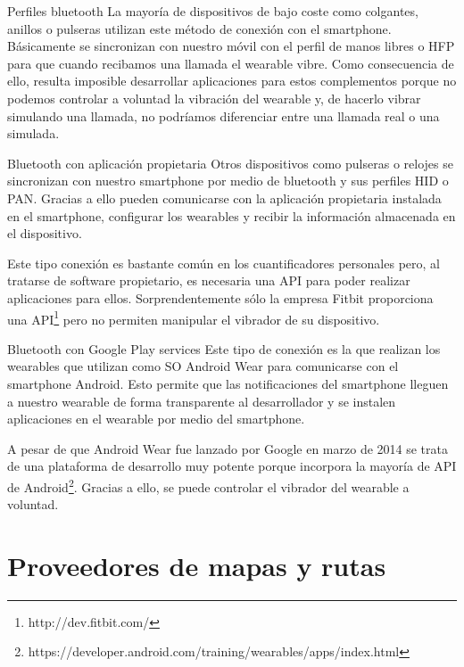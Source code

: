 \begin{definitionlist}
  \item[Perfiles bluetooth] La mayoría de dispositivos de bajo coste como colgantes, anillos o
    pulseras utilizan este método de conexión con el smartphone. Básicamente se sincronizan con
    nuestro móvil con el perfil de manos libres o \acf{HFP} para que cuando recibamos una llamada
    el wearable vibre. Como consecuencia de ello, resulta imposible desarrollar aplicaciones para
    estos complementos porque no podemos controlar a voluntad la vibración del wearable y, de
    hacerlo vibrar simulando una llamada, no podríamos diferenciar entre una llamada real o una
    simulada.

  \item[Bluetooth con aplicación propietaria] Otros dispositivos como pulseras o relojes se
    sincronizan con nuestro smartphone por medio de bluetooth y sus perfiles \acf{HID} o
    \acf{PAN}. Gracias a ello pueden comunicarse con la aplicación propietaria instalada en el
    smartphone, configurar los wearables y recibir la información almacenada en el dispositivo.

    Este tipo conexión es bastante común en los cuantificadores personales pero, al tratarse de
    software propietario, es necesaria una \acs{API} para poder realizar aplicaciones para
    ellos. Sorprendentemente sólo la empresa Fitbit proporciona una
    \acs{API}\footnote{http://dev.fitbit.com/} pero no permiten manipular el vibrador de su
    dispositivo.

  \item[Bluetooth con Google Play services] Este tipo de conexión es la que realizan los wearables
    que utilizan como \acs{SO} Android Wear para comunicarse con el smartphone Android. Esto permite
    que las notificaciones del smartphone lleguen a nuestro wearable de forma transparente al
    desarrollador y se instalen aplicaciones en el wearable por medio del smartphone.

    A pesar de que Android Wear fue lanzado por Google en marzo de 2014 se trata de una plataforma
    de desarrollo muy potente porque incorpora la mayoría de \acs{API} de
    Android\footnote{https://developer.android.com/training/wearables/apps/index.html}. Gracias a
    ello, se puede controlar el vibrador del wearable a voluntad.
 
\end{definitionlist}

\section{Proveedores de mapas y rutas}

